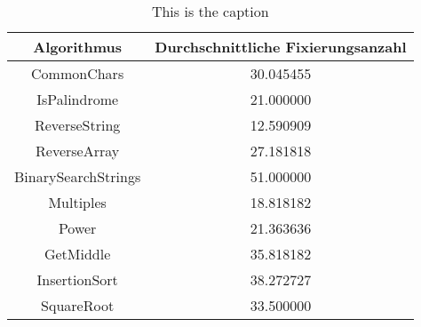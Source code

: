 \begin{table}
\centering
\caption{This is the caption}
\label{tab:table_label}
\begin{tabular}{cc}
\toprule
        Algorithmus &  Durchschnittliche Fixierungsanzahl \\
\midrule
        CommonChars &                           30.045455 \\
       IsPalindrome &                           21.000000 \\
      ReverseString &                           12.590909 \\
       ReverseArray &                           27.181818 \\
BinarySearchStrings &                           51.000000 \\
          Multiples &                           18.818182 \\
              Power &                           21.363636 \\
          GetMiddle &                           35.818182 \\
      InsertionSort &                           38.272727 \\
         SquareRoot &                           33.500000 \\
\bottomrule
\end{tabular}
\end{table}

